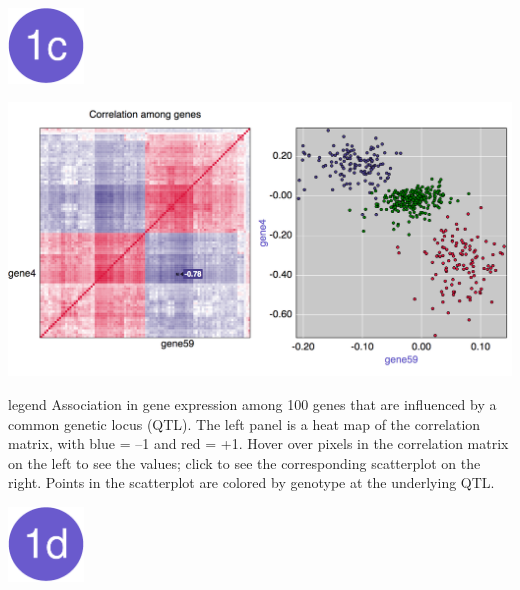 \documentclass[final,plain]{beamer}
\newlength{\onecolwid}
\newlength{\twocolwid}
\newcommand{\colfourvsep}{\vspace{10mm}}
\begin{document}
\begin{frame}[t]
\begin{columns}[t]
\begin{column}{\twocolwid}
\begin{columns}[t]
\begin{column}{\onecolwid}
        \href{http://www.biostat.wisc.edu/~kbroman/posters/ENAR2014/1c}{\includegraphics[width=2cm]{Figs/dot1c.pdf}}

        \centerline{\href{http://www.biostat.wisc.edu/~kbroman/posters/ENAR2014/1c}{\includegraphics[width=\onecolwid]{Figs/1c.png}}}

      \vspace{10mm} %

        \begin{beamercolorbox}[sep=1em, wd=\onecolwid]{legend} \rmfamily
           Association in gene expression among 100 genes that are
           influenced by a common genetic locus (QTL).  The left panel
           is a heat map of the correlation matrix, with blue = --1
           and red = +1. Hover over pixels in the correlation matrix
           on the left to see the values; click to see the
           corresponding scatterplot on the right. Points in the
           scatterplot are colored by genotype at the underlying QTL.
        \end{beamercolorbox}


    \colfourvsep %

        \href{http://www.biostat.wisc.edu/~kbroman/posters/ENAR2014/1d}{\includegraphics[width=2cm]{Figs/dot1d.pdf}}


\end{column}
\end{columns}
\end{column}
\end{columns}
\end{frame}
\end{document}
